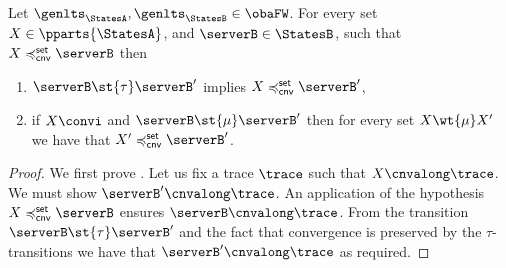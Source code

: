 \noindent%
\textbf{}
  Let $\genlts_\StatesA, \genlts_\StatesB \in \obaFW$.
  For every set $X \in \pparts{ \StatesA }$, and
  $\serverB \in \StatesB$, such that
  $X \cnvleqset \serverB$ then
  \begin{enumerate}
  \item
    $\serverB \st{ \tau } \serverB'$ implies $X \cnvleqset \serverB'$,
  \item
    if $X \convi$ and $\serverB \st{\mu} \serverB'$
    then for every set $X \wt{\mu} X'$ %
    we have that $X' \cnvleqset \serverB'$.
  \end{enumerate}
\begin{proof}
  We first prove .
  Let us fix a trace $\trace$ such that $X \cnvalong \trace$.
  We must show $\serverB' \cnvalong \trace$.
  An application of the hypothesis $X \cnvleqset \serverB$ ensures $\serverB \cnvalong \trace$.
  From the transition $\serverB \st{ \tau } \serverB'$ and the fact that
  convergence is preserved by the $\tau$-transitions we have that
  $\serverB' \cnvalong \trace$ as required.


\end{proof}
